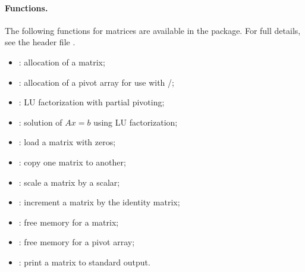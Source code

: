 \paragraph{Functions.}
The following functions for  matrices are available
in the {\dense} package.  For full details, see the header file .
\begin{itemize}
\item {}: allocation of a  matrix;
\item {}: allocation of a pivot array for use
  with /;
\item {}: LU factorization with partial pivoting;
\item {}: solution of $Ax = b$ using LU factorization;
\item {}: load a matrix with zeros;
\item {}: copy one matrix to another;
\item {}: scale a matrix by a scalar;
\item {}: increment a matrix by the identity matrix;
\item {}: free memory for a  matrix;
\item {}: free memory for a pivot array;
\item {}: print a  matrix to standard output.
\end{itemize}

